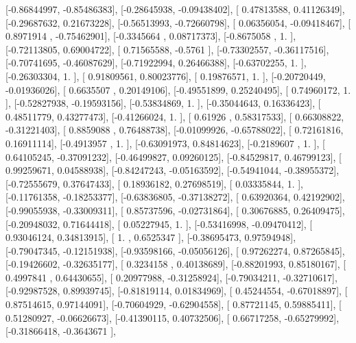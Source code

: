 \documentclass{article}
\begin{document}
       [-0.86844997, -0.85486383],
       [-0.28645938, -0.09438402],
       [ 0.47813588,  0.41126349],
       [-0.29687632,  0.21673228],
       [-0.56513993, -0.72660798],
       [ 0.06356054, -0.09418467],
       [ 0.8971914 , -0.75462901],
       [-0.3345664 ,  0.08717373],
       [-0.8675058 ,  1.        ],
       [-0.72113805,  0.69004722],
       [ 0.71565588, -0.5761    ],
       [-0.73302557, -0.36117516],
       [-0.70741695, -0.46087629],
       [-0.71922994,  0.26466388],
       [-0.63702255,  1.        ],
       [-0.26303304,  1.        ],
       [ 0.91809561,  0.80023776],
       [ 0.19876571,  1.        ],
       [-0.20720449, -0.01936026],
       [ 0.6635507 ,  0.20149106],
       [-0.49551899,  0.25240495],
       [ 0.74960172,  1.        ],
       [-0.52827938, -0.19593156],
       [-0.53834869,  1.        ],
       [-0.35044643,  0.16336423],
       [ 0.48511779,  0.43277473],
       [-0.41266024,  1.        ],
       [ 0.61926   ,  0.58317533],
       [ 0.66308822, -0.31221403],
       [ 0.8859088 ,  0.76488738],
       [-0.01099926, -0.65788022],
       [ 0.72161816,  0.16911114],
       [-0.4913957 ,  1.        ],
       [-0.63091973,  0.84814623],
       [-0.2189607 ,  1.        ],
       [ 0.64105245, -0.37091232],
       [-0.46499827,  0.09260125],
       [-0.84529817,  0.46799123],
       [ 0.99259671,  0.04588938],
       [-0.84247243, -0.05163592],
       [-0.54941044, -0.38955372],
       [-0.72555679,  0.37647433],
       [ 0.18936182,  0.27698519],
       [ 0.03335844,  1.        ],
       [-0.11761358, -0.18253377],
       [-0.63836805, -0.37138272],
       [ 0.63920364,  0.42192902],
       [-0.99055938, -0.33009311],
       [ 0.85737596, -0.02731864],
       [ 0.30676885,  0.26409475],
       [-0.20948032,  0.71644418],
       [ 0.05227945,  1.        ],
       [-0.53416998, -0.09470412],
       [ 0.93046124,  0.34813915],
       [ 1.        ,  0.6525347 ],
       [-0.38695473,  0.97594948],
       [-0.79047345, -0.12151938],
       [-0.93598166, -0.05056126],
       [ 0.97262274,  0.87265845],
       [-0.19426602, -0.32635177],
       [ 0.3234158 ,  0.40138689],
       [-0.88201993,  0.85180167],
       [ 0.4997841 ,  0.64430655],
       [ 0.20977988, -0.31258924],
       [-0.79034211, -0.32710617],
       [-0.92987528,  0.89939745],
       [-0.81819114,  0.01834969],
       [ 0.45244554, -0.67018897],
       [ 0.87514615,  0.97144091],
       [-0.70604929, -0.62904558],
       [ 0.87721145,  0.59885411],
       [ 0.51280927, -0.06626673],
       [-0.41390115,  0.40732506],
       [ 0.66717258, -0.65279992],
       [-0.31866418, -0.3643671 ],
\end{document}
